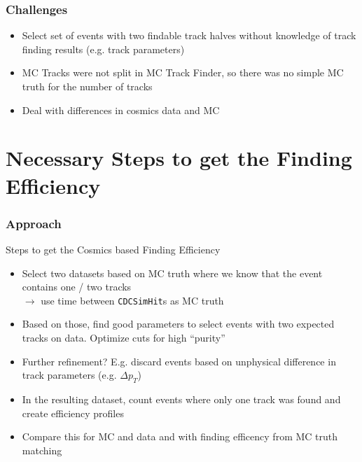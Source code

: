 \documentclass[18pt]{beamer}
\begin{document}
\begin{frame}
  \frametitle{Challenges}
  \begin{itemize}
  \item Select set of events with two findable track halves without knowledge of track finding results (e.g. track parameters)
  \item MC Tracks were not split in MC Track Finder, so there was no simple MC truth for the number of tracks
  \item Deal with differences in cosmics data and MC
  \end{itemize}
\end{frame}

\section{Necessary Steps to get the Finding Efficiency}
\begin{frame}
  \frametitle{Approach}
  \begin{block}{Steps to get the Cosmics based Finding Efficiency}
  \begin{itemize}
  \item Select two datasets based on MC truth where we know that the event contains one / two tracks\\
    $\rightarrow$ use time between \texttt{CDCSimHit}s as MC truth
  \item Based on those, find good parameters to select events with two expected tracks on data. Optimize cuts for high ``purity''
  \item Further refinement? E.g. discard events based on unphysical difference in track parameters (e.g. $\Delta p_T$)
  \item In the resulting dataset, count events where only one track was found and create efficiency profiles
  \item Compare this for MC and data and with finding efficency from MC truth matching
  \end{itemize}
\end{block}

\end{frame}
\end{document}
